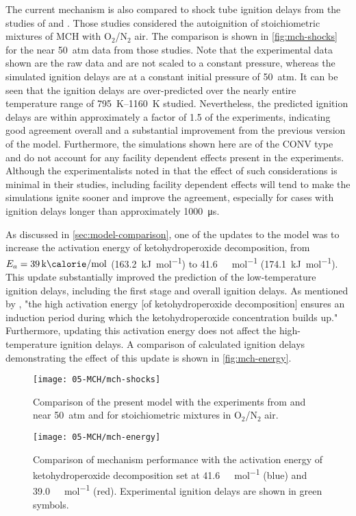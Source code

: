 \documentclass[12pt, letterpaper]{article}
\begin{document}
The current mechanism is also compared to shock tube ignition delays from the
studies of \textcite{Vasu2009} and \textcite{Vanderover2009}. Those studies
considered the autoignition of stoichiometric mixtures of MCH with O$_2$/N$_2$
air. The comparison is shown in \autoref{fig:mch-shocks} for the near \SI{50}{atm}
data from those studies. Note that the experimental data shown are the raw
data and are not scaled to a constant pressure, whereas the simulated
ignition delays are at a constant initial pressure of \SI{50}{atm}. It can be seen
that the ignition delays are over-predicted over the nearly entire temperature
range of \SIrange{795}{1160}{\kelvin} studied. Nevertheless, the predicted ignition delays are
within approximately a factor of 1.5 of the experiments, indicating good
agreement overall and a substantial improvement from the previous version of
the model. Furthermore, the simulations shown here are of the CONV type and
do not account for any facility dependent effects present in the experiments.
Although the experimentalists noted in \cite{Vasu2009,Vanderover2009} that the
effect of such considerations is minimal in their studies, including facility
dependent effects will tend to make the simulations ignite sooner and improve
the agreement, especially for cases with ignition delays longer than
approximately \SI{1000}{\micro\second}.

As discussed in \autoref{sec:model-comparison}, one of the updates to the model
was to increase the activation energy of ketohydroperoxide decomposition, from
$E_a=\SI{39}{\kilo\calorie\per\mole}$ (\SI{163.2}{\kilo\joule\per\mole}) to
\SI{41.6}{\kilo\calorie\per\mole} (\SI{174.1}{\kilo\joule\per\mole}). This
update substantially improved the prediction of the low-temperature ignition
delays, including the first stage and overall ignition delays. As mentioned by
\textcite{Curran2002}, "the high activation energy [of ketohydroperoxide
decomposition] ensures an induction period during which the ketohydroperoxide
concentration builds up." Furthermore, updating this activation energy does not
affect the high-temperature ignition delays. A comparison of calculated
ignition delays demonstrating the effect of this update is shown in
\autoref{fig:mch-energy}.

\begin{figure}
    \begin{floatrow}
        \ffigbox
            {\texttt{[image: 05-MCH/mch-shocks]}}
            {\caption{Comparison of the present model with the experiments from
                \textcite{Vasu2009} and \textcite{Vanderover2009} near \SI{50}{atm}
                and for stoichiometric mixtures in O$_2$/N$_2$ air.}
            \label{fig:mch-shocks}}
        \ffigbox
            {\texttt{[image: 05-MCH/mch-energy]}}
            {\caption{Comparison of mechanism performance with the activation energy
                of ketohydroperoxide decomposition set at \SI{41.6}{\kilo\calorie\per\mole} (blue) and
                \SI{39.0}{\kilo\calorie\per\mole} (red). Experimental ignition delays are shown in
                green symbols.}
            \label{fig:mch-energy}}
    \end{floatrow}
\end{figure}
\end{document}
